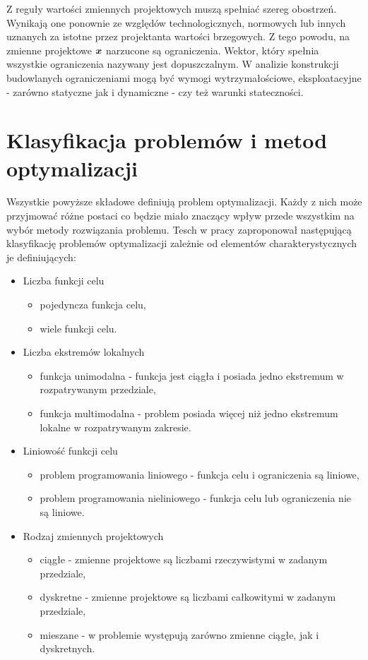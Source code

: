 Z reguły wartości zmiennych projektowych muszą spełniać szereg obostrzeń. Wynikają one ponownie ze względów technologicznych, normowych lub innych uznanych za istotne przez projektanta wartości brzegowych. Z tego powodu, na zmienne projektowe $\bm{x}$ narzucone są ograniczenia. Wektor, który spełnia wszystkie ograniczenia nazywany jest dopuszczalnym. W analizie konstrukcji budowlanych ograniczeniami mogą być wymogi wytrzymałościowe, eksploatacyjne - zarówno statyczne jak i dynamiczne - czy też warunki stateczności.


\section{Klasyfikacja problemów i metod optymalizacji}
Wszystkie powyższe składowe definiują problem optymalizacji. Każdy z nich może przyjmować różne postaci co będzie miało znaczący wpływ przede wszystkim na wybór metody rozwiązania problemu. Tesch w pracy \cite{Tesch2016} zaproponował następującą klasyfikację problemów optymalizacji zależnie od elementów charakterystycznych je definiujących:
\begin{itemize}
	\item Liczba funkcji celu
	\begin{itemize}
		\item pojedyncza funkcja celu,
		\item wiele funkcji celu.
	\end{itemize}
	\item Liczba ekstremów lokalnych
	\begin{itemize}
		\item funkcja unimodalna - funkcja jest ciągła i posiada jedno ekstremum w rozpatrywanym przedziale,
		\item funkcja multimodalna - problem posiada więcej niż jedno ekstremum lokalne w rozpatrywanym zakresie.
	\end{itemize}
	\item Liniowość funkcji celu
	\begin{itemize}
		\item problem programowania liniowego - funkcja celu i ograniczenia są liniowe,
		\item problem programowania nieliniowego - funkcja celu lub ograniczenia nie są liniowe.
	\end{itemize}
	\item Rodzaj zmiennych projektowych
	\begin{itemize}
		\item ciągłe - zmienne projektowe są liczbami rzeczywistymi w zadanym przedziale,
		\item dyskretne - zmienne projektowe są liczbami całkowitymi w zadanym przedziale,
		\item mieszane - w problemie występują zarówno zmienne ciągłe, jak i dyskretnych.
	\end{itemize}
\end{itemize}

